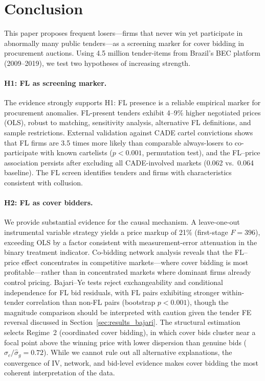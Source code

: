 \section{Conclusion}
\label{sec:conclusion}

This paper proposes frequent losers---firms that never win yet
participate in abnormally many public tenders---as a screening marker for
cover bidding in procurement auctions. Using 4.5 million tender-items
from Brazil's BEC platform (2009--2019), we test two hypotheses of
increasing strength.

\paragraph{H1: FL as screening marker.}
The evidence strongly supports H1: FL presence is a reliable empirical
marker for procurement anomalies. FL-present tenders exhibit 4--9\%
higher negotiated prices (OLS), robust to matching, sensitivity analysis,
alternative FL definitions, and sample restrictions. External validation
against CADE cartel convictions shows that FL firms are 3.5 times
more likely than comparable always-losers to co-participate with known
cartelists ($p < 0.001$, permutation test), and the FL--price
association persists after excluding all CADE-involved markets (0.062
vs.\ 0.064 baseline). The FL screen identifies tenders and firms with
characteristics consistent with collusion.

\paragraph{H2: FL as cover bidders.}
We provide substantial evidence for the causal mechanism. A leave-one-out
instrumental variable strategy yields a price markup of 21\%
(first-stage $F = 396$), exceeding OLS by a factor consistent with
measurement-error attenuation in the binary treatment indicator.
Co-bidding network analysis reveals that the FL--price effect
concentrates in competitive markets---where cover bidding is most
profitable---rather than in concentrated markets where dominant firms
already control pricing. Bajari--Ye tests reject exchangeability and
conditional independence for FL bid residuals, with FL pairs exhibiting
stronger within-tender correlation than non-FL pairs (bootstrap
$p < 0.001$), though the magnitude comparison should be interpreted
with caution given the tender FE reversal discussed in
Section~\ref{sec:results_bajari}. The structural estimation selects %
Regime~2 (coordinated cover bidding), in which cover bids cluster
near a focal point above the winning price with lower dispersion
than genuine bids ($\hat{\sigma}_c / \hat{\sigma}_g = 0.72$).
While we cannot rule out all alternative explanations, the convergence
of IV, network, and bid-level evidence makes cover bidding the most
coherent interpretation of the data.

